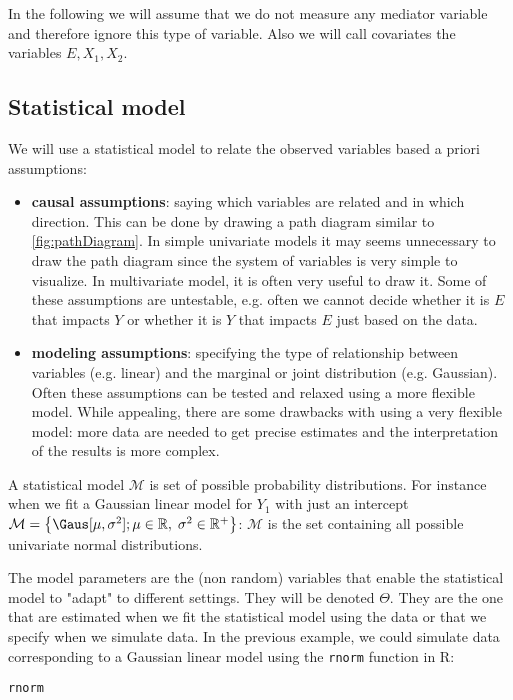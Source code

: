 \documentclass{article}
\newcommand\model{\mathcal{M}}
\newcommand\Real{\mathbb{R}}
\begin{document}
In the following we will assume that we do not measure any mediator
variable and therefore ignore this type of variable. Also we will call
covariates the variables \(E,X_1,X_2\).

\subsection{Statistical model}
\label{sec:orgd07908d}

We will use a statistical model to relate the observed variables based
a priori assumptions:
\begin{itemize}
\item \textbf{causal assumptions}: saying which variables are related and in
which direction. This can be done by drawing a path diagram similar
to \autoref{fig:pathDiagram}. In simple univariate models it may seems
unnecessary to draw the path diagram since the system of variables is
very simple to visualize. In multivariate model, it is often very
useful to draw it. Some of these assumptions are untestable,
e.g. often we cannot decide whether it is \(E\) that impacts \(Y\)
or whether it is \(Y\) that impacts \(E\) just based on the data.
\item \textbf{modeling assumptions}: specifying the type of relationship between
variables (e.g. linear) and the marginal or joint distribution
(e.g. Gaussian). Often these assumptions can be tested and relaxed
using a more flexible model. While appealing, there are some
drawbacks with using a very flexible model: more data are needed to
get precise estimates and the interpretation of the results is more
complex.
\end{itemize}

A statistical model \(\model\) is set of possible probability
distributions. For instance when we fit a Gaussian linear model for
\(Y_1\) with just an intercept \(\model=\left\{\Gaus[\mu,\sigma^2];\mu
\in \Real, \; \sigma^2 \in \Real^+ \right\}\): \(\model\) is the set
containing all possible univariate normal distributions.

\bigskip

The model parameters are the (non random) variables that enable the
statistical model to "adapt" to different settings. They will be
denoted \(\Theta\). They are the one that are estimated when we fit
the statistical model using the data or that we specify when we
simulate data. In the previous example, we could simulate data
corresponding to a Gaussian linear model using the \texttt{rnorm} function in R:
\lstset{language=r,label= ,caption= ,captionpos=b,numbers=none}
\begin{lstlisting}
rnorm
\end{lstlisting}
\end{document}
